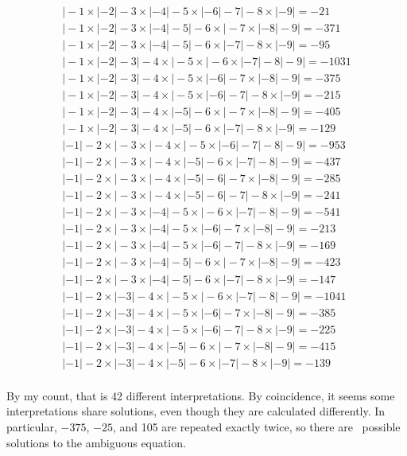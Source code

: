 \documentclass{article}
\begin{document}
\begin{center}
\begin{align*}
\big|-1\times|-2|-3\times|-4|-5\times|-6|-7\big|-8\times|-9|=-21 \\
\big|-1\times|-2|-3\times|-4|-5\big|-6\times\big|-7\times|-8|-9\big|=-371 \\
\big|-1\times|-2|-3\times|-4|-5\big|-6\times|-7|-8\times|-9|=-95 \\
\big|-1\times|-2|-3\big|-4\times\Big|-5\times\big|-6\times|-7|-8\big|-9\Big|=-1031 \\
\big|-1\times|-2|-3\big|-4\times\big|-5\times|-6|-7\times|-8|-9\big|=-375 \\
\big|-1\times|-2|-3\big|-4\times\big|-5\times|-6|-7\big|-8\times|-9|=-215 \\
\big|-1\times|-2|-3\big|-4\times|-5|-6\times\big|-7\times|-8|-9\big|=-405 \\
\big|-1\times|-2|-3\big|-4\times|-5|-6\times|-7|-8\times|-9|=-129 \\
|-1|-2\times\bigg|-3\times\Big|-4\times\big|-5\times|-6|-7\big|-8\Big|-9\bigg|=-953 \\
|-1|-2\times\Big|-3\times\big|-4\times|-5|-6\times|-7|-8\big|-9\Big|=-437 \\
|-1|-2\times\Big|-3\times\big|-4\times|-5|-6\big|-7\times|-8|-9\Big|=-285 \\
|-1|-2\times\Big|-3\times\big|-4\times|-5|-6\big|-7\Big|-8\times|-9|=-241 \\
|-1|-2\times\Big|-3\times|-4|-5\times\big|-6\times|-7|-8\big|-9\Big|=-541 \\
|-1|-2\times\big|-3\times|-4|-5\times|-6|-7\times|-8|-9\big|=-213 \\
|-1|-2\times\big|-3\times|-4|-5\times|-6|-7\big|-8\times|-9|=-169 \\
|-1|-2\times\big|-3\times|-4|-5\big|-6\times\big|-7\times|-8|-9\big|=-423 \\
|-1|-2\times\big|-3\times|-4|-5\big|-6\times|-7|-8\times|-9|=-147 \\
|-1|-2\times|-3|-4\times\Big|-5\times\big|-6\times|-7|-8\big|-9\Big|=-1041 \\
|-1|-2\times|-3|-4\times\big|-5\times|-6|-7\times|-8|-9\big|=-385 \\
|-1|-2\times|-3|-4\times\big|-5\times|-6|-7\big|-8\times|-9|=-225 \\
|-1|-2\times|-3|-4\times|-5|-6\times\big|-7\times|-8|-9\big|=-415 \\
|-1|-2\times|-3|-4\times|-5|-6\times|-7|-8\times|-9|=-139 \\
\end{align*}

\end{center}

By my count, that is 42 different interpretations.
By coincidence, it seems some interpretations share solutions, even though they are calculated differently.
In particular, $-375$, $-25$, and 105 are repeated exactly twice, so there are
\, 
possible solutions to the ambiguous equation.
\end{document}
